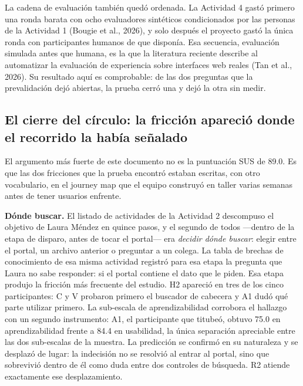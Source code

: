 La cadena de evaluación también quedó ordenada. La Actividad 4 gastó primero una ronda barata con
ocho evaluadores sintéticos condicionados por las personas de la Actividad 1 (Bougie et al.,
2026), y solo después el proyecto gastó la única ronda con participantes humanos de que disponía.
Esa secuencia, evaluación simulada antes que humana, es la que la literatura reciente describe al
automatizar la evaluación de experiencia sobre interfaces web reales (Tan et al., 2026). Su
resultado aquí es comprobable: de las dos preguntas que la
prevalidación dejó abiertas, la prueba cerró una y dejó la otra sin medir.

\subsection{El cierre del círculo: la fricción apareció donde el recorrido la había señalado}

El argumento más fuerte de este documento no es la puntuación SUS de 89.0. Es que las dos
fricciones que la prueba encontró estaban escritas, con otro vocabulario, en el journey map que el
equipo construyó en taller varias semanas antes de tener usuarios enfrente.

\textbf{Dónde buscar.} El listado de actividades de la Actividad 2 descompuso el objetivo de Laura
Méndez en quince pasos, y el segundo de todos ---dentro de la etapa de disparo, antes de tocar el
portal--- era \emph{decidir dónde buscar}: elegir entre el portal, un archivo anterior o preguntar
a un colega. La tabla de brechas de conocimiento de esa misma actividad registró para esa etapa la
pregunta que Laura no sabe responder: si el portal contiene el dato que le piden. Esa etapa
produjo la fricción más frecuente del estudio. H2 apareció en tres de los cinco participantes: C y
V probaron primero el buscador de cabecera y A1 dudó qué parte utilizar primero. La sub-escala de
aprendizabilidad corrobora el hallazgo con un segundo instrumento: A1, el participante que
titubeó, obtuvo 75.0 en aprendizabilidad frente a 84.4 en usabilidad, la única separación
apreciable entre las dos sub-escalas de la muestra. La predicción se confirmó en su naturaleza y
se desplazó de lugar: la indecisión no se resolvió al entrar al portal, sino que sobrevivió dentro
de él como duda entre dos controles de búsqueda. R2 atiende exactamente ese desplazamiento.

